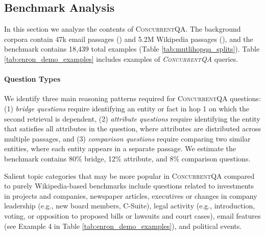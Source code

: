 \documentclass{article}
\newcommand{\datasetname}{\textsc{ConcurrentQA}\xspace}
\begin{document}
\subsection{Benchmark Analysis}
In this section we analyze the contents of \datasetname. The background corpora 
contain 47k email passages () and 5.2M Wikipedia passages (), and the benchmark contains 18,439 total examples 
(Table \ref{tab:mutlihopqa_splits}). Table \ref{tab:enron_demo_examples} includes examples of \textit{\datasetname} queries. 



\paragraph{Question Types} We identify three main reasoning patterns required for \datasetname questions: (1) \textit{bridge questions} require identifying an entity or fact in hop 1 on which the second retrieval is dependent, (2) \textit{attribute questions} require identifying the entity that satisfies all attributes in the question, where attributes are distributed across multiple passages, and (3) \textit{comparison questions} require comparing two similar entities, where each entity appears in a separate passage. We estimate the benchmark contains 80\% bridge, 12\% attribute, and 8\% comparison questions.

Salient topic categories that may be more popular in \datasetname compared to purely Wikipedia-based benchmarks include 
questions 
related to investments in projects and companies, 
newspaper articles,
executives or changes in company leadership (e.g., new board members, C-Suite),
legal activity (e.g., introduction, voting, or opposition to proposed bills or lawsuits and court cases),
email features (see Example 4 in Table \ref{tab:enron_demo_examples}), and political events.
\end{document}
